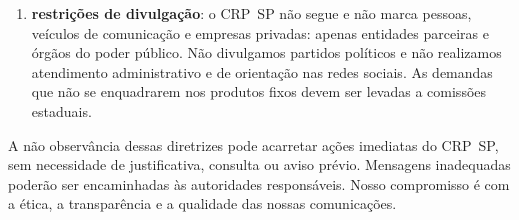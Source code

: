 \begin{enumerate}
\begin{enumerate}
          \item
                usarem linguagem inapropriada, obscena, caluniosa, grosseira,
                abusiva, difamatória ou ofensiva;
          \item
                fizerem apologia a práticas ilícitas;
          \item
                incitarem ódio, violência, racismo ou qualquer forma de
                discriminação;
          \item
                contiverem ameaças, assédio, injúria, calúnia, difamação ou qualquer
                outro ilícito penal;
          \item
                divulgarem conteúdos na forma de \emph{spam} ou ``correntes'';
          \item
                tiverem objetivo comercial ou publicitário;
          \item
                forem ininteligíveis ou fora de contexto;
          \item
                contiverem propagandas político-partidárias;
          \item
                contiverem \emph{links} suspeitos ou representarem ameaça à
                segurança da informação;
          \item
                usarem informações e imagens de pessoas e instituições de modo
                indevido;
          \item
                contiverem dados pessoais da autora, do autor ou de terceiros;
          \item
                violarem direitos de imagem e de propriedade intelectual;
          \item
                forem fraudulentos (perfis falsos e/ou \emph{bots}) ou promoverem
                conteúdo inverídico (\emph{fake news}).
        \end{enumerate}
  \item
        \textbf{restrições de divulgação}: o CRP~SP não segue e não marca
        pessoas, veículos de comunicação e empresas privadas: apenas entidades
        parceiras e órgãos do poder público. Não divulgamos partidos políticos
        e não realizamos atendimento administrativo e de orientação nas redes
        sociais. As demandas que não se enquadrarem nos produtos fixos devem
        ser levadas a comissões estaduais.
\end{enumerate}

A não observância dessas diretrizes pode acarretar ações imediatas do
CRP~SP, sem necessidade de justificativa, consulta ou aviso prévio.
Mensagens inadequadas poderão ser encaminhadas às autoridades
responsáveis. Nosso compromisso é com a ética, a transparência e a
qualidade das nossas comunicações.

